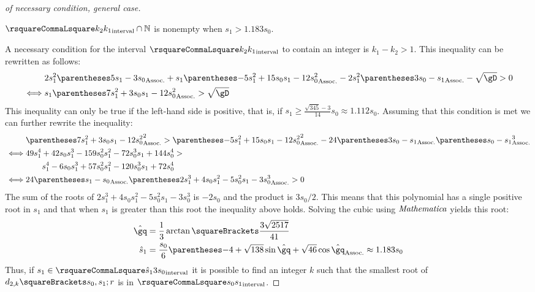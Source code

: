 \documentclass[10pt, a4paper, twoside]{basestyle}
\begin{document}
\begin{proof}[of necessary condition, general case]
\[\]
\begin{claim}
$\intopen{k_2}{k_1}\Intersection{\Naturals}$ is nonempty when $s_1>1.183s_0$.
\end{claim}
A necessary condition for the interval $\intopen{k_2}{k_1}$ to contain an integer is $k_1-k_2>1$.  This inequality can be rewritten as follows:
\begin{align*}
&2s_1^2\pa{5s_1-3s_0} + s_1\pa{-5s_1^2 + 15 s_0 s_1 - 12s_0^2} - 2s_1^2\pa{3s_0-s_1} - \sqrt{\gD} > 0 \\
\iff &s_1\pa{7s_1^2 + 3 s_0 s_1 - 12s_0^2} > \sqrt{\gD}
\end{align*}
This inequality can only be true if the left-hand side is positive, that is, if $s_1 ≥ \frac{\sqrt{345}-3}{14}s_0 \approx 1.112s_0$.  Assuming that this condition is met we can further rewrite the inequality:
\begin{align*}
&\pa{7s_1^2 + 3 s_0 s_1 - 12s_0^2}^2 > \pa{-5s_1^2 + 15 s_0 s_1 - 12s_0^2}^2 - 24\pa{3s_0-s_1}\pa{s_0-s_1}^3 \\
\iff &49s_1^4 + 42 s_0 s_1^3 - 159 s_0^2 s_1^2 - 72 s_0^3 s_1 + 144 s_0^4 > \\
&\qquad s_1^4 - 6 s_0 s_1^3 + 57 s_0^2 s_1^2 - 120 s_0^3 s_1 + 72 s_0^4 \\
\iff &24\pa{s_1-s_0}\pa{2s_1^3 + 4 s_0 s_1^2 - 5 s_0^2 s_1 - 3s_0^3} > 0
\end{align*}
The sum of the roots of $2s_1^3 + 4 s_0 s_1^2 - 5 s_0^2 s_1 - 3s_0^3$ is $-2s_0$ and the product is $3s_0/2$.  This means that this polynomial has a single positive root in $s_1$ and that when $s_1$ is greater than this root the inequality above holds.  Solving the cubic using $\emph{Mathematica}$ yields this root:
\begin{align*}
\hat\gq &= \frac{1}{3} \arctan\of{\frac{3 \sqrt{2517}}{41}} \\
\hat{s}_1 &= \frac{s_0}{6}\pa{-4+\sqrt{138}\sin\hat\gq + \sqrt{46}\cos\hat\gq} \approx 1.183s_0
\end{align*}
Thus, if $s_1 \in \intopen{\hat{s}_1}{3s_0}$ it is possible to find an integer $k$ such that the smallest root of $d_{2,k}\of{s_0, s_1; r}$ is in $\intopen{s_0} {s_1}$.
\end{proof}
\end{document}
